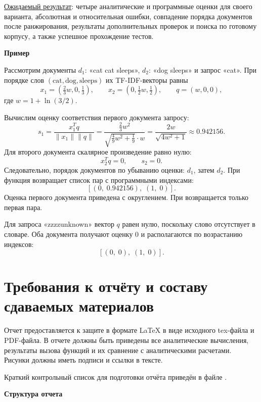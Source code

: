 \documentclass[12pt,a4paper]{article}
\newcommand{\taskhead}[1]{\par\textbf{#1}\par}
\begin{document}
\underline{Ожидаемый результат}: четыре аналитические
и программные оценки для своего варианта,
абсолютная и относительная ошибки,
совпадение порядка документов после ранжирования,
результаты дополнительных проверок и поиска
по готовому корпусу, а также успешное прохождение тестов.

\taskhead{Пример}

Рассмотрим документы $d_1$: «cat cat sleeps»,
$d_2$: «dog sleeps» и запрос «cat».
При порядке слов $(\text{cat},\text{dog},\text{sleeps})$
их TF-IDF-векторы равны
\[
x_1=(\tfrac23w,0,\tfrac13),\qquad
x_2=(0,\tfrac12w,\tfrac12),\qquad
q=(w,0,0),
\]
где $w=1+\ln(3/2)$.

Вычислим оценку соответствия первого документа запросу:
\[
s_1=\frac{x_1^Tq}{\|x_1\|\|q\|}
=\frac{\frac23w^2}
{\sqrt{\frac49w^2+\frac19}\cdot w}
=\frac{2w}{\sqrt{4w^2+1}}
\approx0.942156.
\]
Для второго документа скалярное произведение равно нулю:
\[
x_2^Tq=0,\qquad s_2=0.
\]
Следовательно, порядок документов по убыванию оценки:
$d_1$, затем $d_2$. При  функция возвращает
список пар с программными индексами:
\[
[(0,\;0.942156),\;(1,\;0)].
\]
Оценка первого документа приведена с округлением.
При  возвращается только первая пара.

Для запроса «zzzzunknown» вектор $q$ равен нулю,
поскольку слово отсутствует в словаре.
Оба документа получают оценку $0$ и располагаются
по возрастанию индексов:
\[
[(0,\;0),\;(1,\;0)].
\]

\newpage

\section{Требования к отчёту и составу сдаваемых материалов}

Отчет предоставляется к защите в формате LaTeX в виде исходного tex-файла и PDF-файла. 
В отчете должны быть приведены все аналитические вычисления, результаты вызова функций и их сравнение с аналитическими расчетами. Рисунки должны иметь подписи и ссылки в тексте.

Краткий контрольный список для подготовки отчёта приведён в файле .

\taskhead{Структура отчета}
\end{document}
